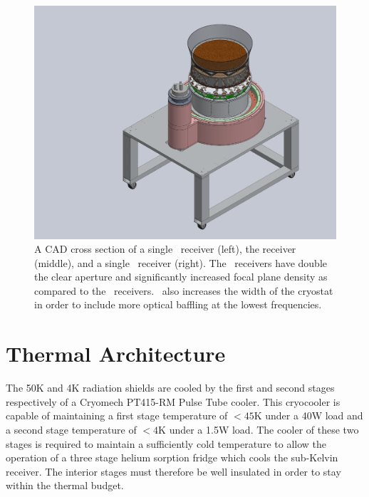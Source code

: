 \documentclass[]{spie}  %
\begin{document}
\begin{figure} [h]
	\begin{center}
		\includegraphics[scale=0.4]{base_on_lowboy.JPG}
	\end{center}
	\caption{A CAD cross section of a single \keckarray\ receiver (left), the
	 receiver (middle), and a single
	\biceparray\ receiver (right). The \biceparray\ receivers have double
	the clear aperture and significantly increased focal plane density as
	compared to the \keckarray\ receivers. \biceparray\ also increases the
	width of the cryostat in order to include more optical baffling at the
	lowest frequencies.}
	\label{fig:base}
\end{figure}


\section{Thermal Architecture}
\label{sec:thermal_architecture}

 The 50K and 4K radiation shields are cooled by the first
and second stages respectively of a Cryomech PT415-RM Pulse Tube cooler. This
cryocooler is capable of maintaining a first stage temperature of $<45$K under
a 40W load and a second stage temperature of $<4$K under a
1.5W load. The cooler of these two stages is required to maintain a
sufficiently cold temperature to allow the operation of a three stage helium
sorption fridge which cools the sub-Kelvin receiver. The interior stages must
therefore be well insulated in order to stay within the thermal budget.

\clearpage
\end{document}

